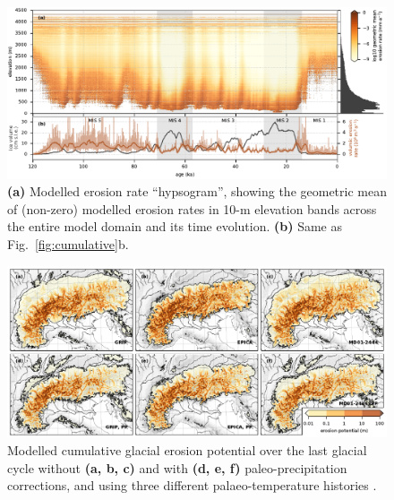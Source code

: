 \documentclass[utf8]{article}
\begin{document}
    \begin{figure}
      \centerline{\includegraphics{alpero_hypsogram}}
      \caption{%
        \textbf{(a)} Modelled erosion rate ``hypsogram'', showing the geometric
          mean of (non-zero) modelled erosion rates in 10-m elevation bands
          across the entire model domain and its time evolution.
        \textbf{(b)} Same as Fig.~\ref{fig:cumulative}b.}
      \label{fig:hypsogram}
    \end{figure}

    \begin{figure}
      \centerline{\includegraphics{alpero_sensitivity}}
      \caption{%
        Modelled cumulative glacial erosion potential over the last glacial
        cycle without \textbf{(a, b, c)} and with \textbf{(d, e, f)}
        paleo-precipitation corrections, and using three different
        palaeo-temperature histories \citep[see][]{Seguinot.etal.2018}.}
      \label{fig:sensitivity}
    \end{figure}
\end{document}
